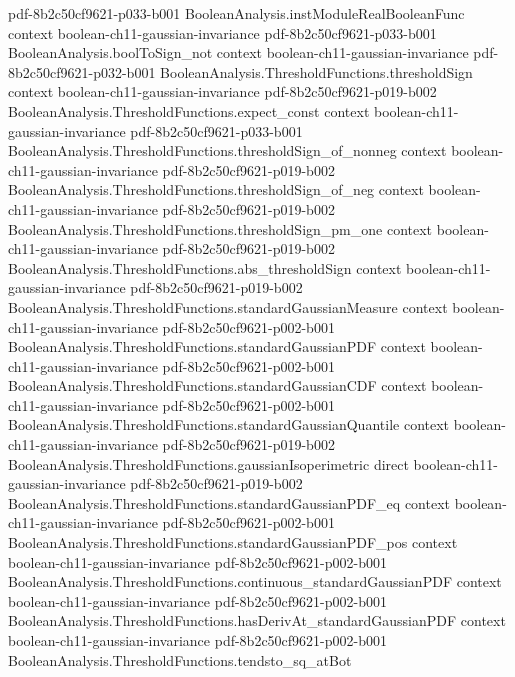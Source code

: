 \begin{theorem}
  {pdf-8b2c50cf9621-p033-b001}
\proofstep
  {BooleanAnalysis.instModuleRealBooleanFunc}
  {context}
  {boolean-ch11-gaussian-invariance}
  {pdf-8b2c50cf9621-p033-b001}
\proofstep
  {BooleanAnalysis.boolToSign_not}
  {context}
  {boolean-ch11-gaussian-invariance}
  {pdf-8b2c50cf9621-p032-b001}
\proofstep
  {BooleanAnalysis.ThresholdFunctions.thresholdSign}
  {context}
  {boolean-ch11-gaussian-invariance}
  {pdf-8b2c50cf9621-p019-b002}
\proofstep
  {BooleanAnalysis.ThresholdFunctions.expect_const}
  {context}
  {boolean-ch11-gaussian-invariance}
  {pdf-8b2c50cf9621-p033-b001}
\proofstep
  {BooleanAnalysis.ThresholdFunctions.thresholdSign_of_nonneg}
  {context}
  {boolean-ch11-gaussian-invariance}
  {pdf-8b2c50cf9621-p019-b002}
\proofstep
  {BooleanAnalysis.ThresholdFunctions.thresholdSign_of_neg}
  {context}
  {boolean-ch11-gaussian-invariance}
  {pdf-8b2c50cf9621-p019-b002}
\proofstep
  {BooleanAnalysis.ThresholdFunctions.thresholdSign_pm_one}
  {context}
  {boolean-ch11-gaussian-invariance}
  {pdf-8b2c50cf9621-p019-b002}
\proofstep
  {BooleanAnalysis.ThresholdFunctions.abs_thresholdSign}
  {context}
  {boolean-ch11-gaussian-invariance}
  {pdf-8b2c50cf9621-p019-b002}
\proofstep
  {BooleanAnalysis.ThresholdFunctions.standardGaussianMeasure}
  {context}
  {boolean-ch11-gaussian-invariance}
  {pdf-8b2c50cf9621-p002-b001}
\proofstep
  {BooleanAnalysis.ThresholdFunctions.standardGaussianPDF}
  {context}
  {boolean-ch11-gaussian-invariance}
  {pdf-8b2c50cf9621-p002-b001}
\proofstep
  {BooleanAnalysis.ThresholdFunctions.standardGaussianCDF}
  {context}
  {boolean-ch11-gaussian-invariance}
  {pdf-8b2c50cf9621-p002-b001}
\proofstep
  {BooleanAnalysis.ThresholdFunctions.standardGaussianQuantile}
  {context}
  {boolean-ch11-gaussian-invariance}
  {pdf-8b2c50cf9621-p019-b002}
\proofstep
  {BooleanAnalysis.ThresholdFunctions.gaussianIsoperimetric}
  {direct}
  {boolean-ch11-gaussian-invariance}
  {pdf-8b2c50cf9621-p019-b002}
\proofstep
  {BooleanAnalysis.ThresholdFunctions.standardGaussianPDF_eq}
  {context}
  {boolean-ch11-gaussian-invariance}
  {pdf-8b2c50cf9621-p002-b001}
\proofstep
  {BooleanAnalysis.ThresholdFunctions.standardGaussianPDF_pos}
  {context}
  {boolean-ch11-gaussian-invariance}
  {pdf-8b2c50cf9621-p002-b001}
\proofstep
  {BooleanAnalysis.ThresholdFunctions.continuous_standardGaussianPDF}
  {context}
  {boolean-ch11-gaussian-invariance}
  {pdf-8b2c50cf9621-p002-b001}
\proofstep
  {BooleanAnalysis.ThresholdFunctions.hasDerivAt_standardGaussianPDF}
  {context}
  {boolean-ch11-gaussian-invariance}
  {pdf-8b2c50cf9621-p002-b001}
\proofstep
  {BooleanAnalysis.ThresholdFunctions.tendsto_sq_atBot}

\end{theorem}
